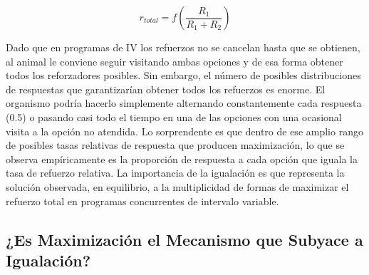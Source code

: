 \documentclass[
  a4paper,
  DIV=11,
  numbers=noendperiod]{scrreprt}
\begin{document}
\[r_{total}= f\left(\frac{R_1}{R_1 + R_2}\right)\]

Dado que en programas de IV los refuerzos no se cancelan hasta que se
obtienen, al animal le conviene seguir visitando ambas opciones y de esa
forma obtener todos los reforzadores posibles. Sin embargo, el número de
posibles distribuciones de respuestas que garantizarían obtener todos
los refuerzos es enorme. El organismo podría hacerlo simplemente
alternando constantemente cada respuesta (0.5) o pasando casi todo el
tiempo en una de las opciones con una ocasional visita a la opción no
atendida. Lo sorprendente es que dentro de ese amplio rango de posibles
tasas relativas de respuesta que producen maximización, lo que se
observa empíricamente es la proporción de respuesta a cada opción que
iguala la tasa de refuerzo relativa. La importancia de la igualación es
que representa la solución observada, en equilibrio, a la multiplicidad
de formas de maximizar el refuerzo total en programas concurrentes de
intervalo variable.

\subsection{¿Es Maximización el Mecanismo que Subyace a
Igualación?}\label{es-maximizaciuxf3n-el-mecanismo-que-subyace-a-igualaciuxf3n}
\end{document}
